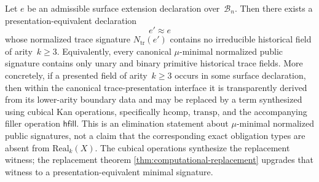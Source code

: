 \documentclass{lmcs}
\newcommand{\B}{\mathcal{B}}
\newcommand{\Real}{\mathrm{Real}}
\newcommand{\hcomp}{\mathrm{hcomp}}
\newcommand{\transp}{\mathrm{transp}}
\begin{document}
\begin{thm}
\label{thm:higher-elim}
Let $e$ be an admissible surface extension declaration over~$\B_n$. Then there exists a presentation-equivalent declaration
\[
  e' \approx e
\]
whose normalized trace signature $N_{\mathrm{tr}}(e')$ contains no irreducible historical field of arity~$k \geq 3$. Equivalently, every canonical $\mu$-minimal normalized public signature contains only unary and binary primitive historical trace fields. More concretely, if a presented field of arity~$k \geq 3$ occurs in some surface declaration, then within the canonical trace-presentation interface it is transparently derived from its lower-arity boundary data and may be replaced by a term synthesized using cubical Kan operations, specifically $\hcomp$, $\transp$, and the accompanying filler operation $\mathsf{hfill}$.
This is an elimination statement about $\mu$-minimal normalized public signatures, not a claim that the corresponding exact obligation types are absent from $\Real_k(X)$. The cubical operations synthesize the replacement witness; the replacement theorem \autoref{thm:computational-replacement} upgrades that witness to a presentation-equivalent minimal signature.
\end{thm}
\end{document}
